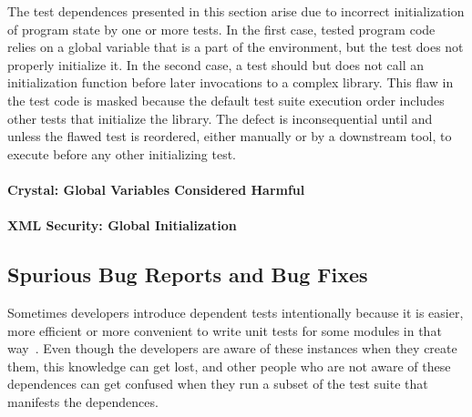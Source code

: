 
The test dependences presented in this section arise due to incorrect initialization
of program state by one or more tests. In the first case,
%
tested program code relies on a
global variable that is a part of the environment, but the test does
not properly initialize it.  In the second case, a test should but
does not call
an initialization function before later invocations to a complex library.
This flaw in the test code is masked because the default test suite execution
order includes other tests that initialize the library.  The defect is
inconsequential until and unless the flawed test is reordered, either manually or by
a downstream tool, to execute before any other initializing test.


\paragraph{Crystal: Global Variables Considered Harmful}


\paragraph{XML Security: Global Initialization}



\subsection{Spurious Bug Reports and Bug Fixes}\label{sec:spurious}
Sometimes developers introduce dependent tests intentionally because it is
easier, more efficient or more convenient to write unit tests for some modules
in that way~\cite{kapfhammeretal:FSE:2003, whittakeretal:2012}.
Even though the developers are aware of these instances
when they create them, this knowledge can get lost, 
and other people who are not aware of these dependences can get confused 
when they run a subset of the test suite that manifests the
dependences.

